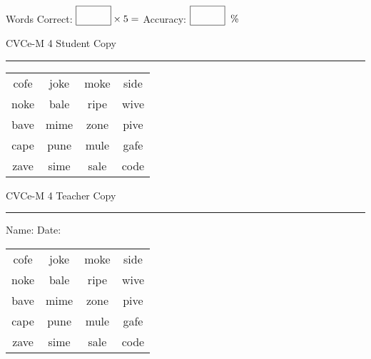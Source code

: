 \documentclass{memoir}
\begin{document}
\small

Words Correct: $\fbox{\phantom{\huge 100}} \times 5 = $ Accuracy: $\fbox{\phantom{\huge 100}}\;\; \%$ 

\vfill

\newpage


\footnotesize \noindent
CVCe-M 4 \hfill Student Copy
\smallskip
\hrule

\Large

\setlength{\tabcolsep}{14pt}
\def\arraystretch{2}

{\selectfont


\begin{vplace}[0.5]
\begin{center}
\begin{tabular}{cccc}
cofe & joke & moke & side \\
noke & bale & ripe & wive \\
bave & mime & zone & pive \\
cape & pune & mule & gafe \\
zave & sime & sale & code \\
\end{tabular}
\end{center}
\end{vplace}

}

\newpage

\footnotesize \noindent
CVCe-M 4 \hfill Teacher Copy
\smallskip
\hrule

\small

\vfill

\noindent
Name: \underline{\hspace{1.75in}} \hfill Date: \underline{\hspace{1in}}

\Large

{\selectfont


\begin{vplace}[0.5]
\begin{center}
\begin{tabular}{cccc}
cofe & joke & moke & side \\
noke & bale & ripe & wive \\
bave & mime & zone & pive \\
cape & pune & mule & gafe \\
zave & sime & sale & code \\
\end{tabular}
\end{center}
\end{vplace}



}
\end{document}
